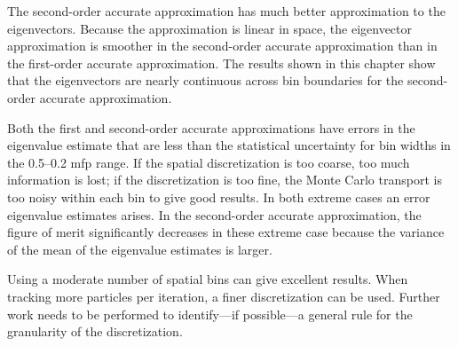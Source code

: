 The second-order accurate approximation has much better approximation to the eigenvectors.  Because the approximation is linear in space, the eigenvector approximation is smoother in the second-order accurate approximation than in the first-order accurate approximation.  The results shown in this chapter show that the eigenvectors are nearly continuous across bin boundaries for the second-order accurate approximation.

Both the first and second-order accurate approximations have errors in the eigenvalue estimate that are less than the statistical uncertainty for bin widths in the 0.5--0.2 mfp range.  If the spatial discretization is too coarse, too much information is lost; if the discretization is too fine, the Monte Carlo transport is too noisy within each bin to give good results.  In both extreme cases an error eigenvalue estimates arises.  In the second-order accurate approximation, the figure of merit significantly decreases in these extreme case because the variance of the mean of the eigenvalue estimates is larger.  

Using a moderate number of spatial bins can give excellent results.  When tracking more particles per iteration, a finer discretization can be used.  Further work needs to be performed to identify---if possible---a general rule for the granularity of the discretization.  


